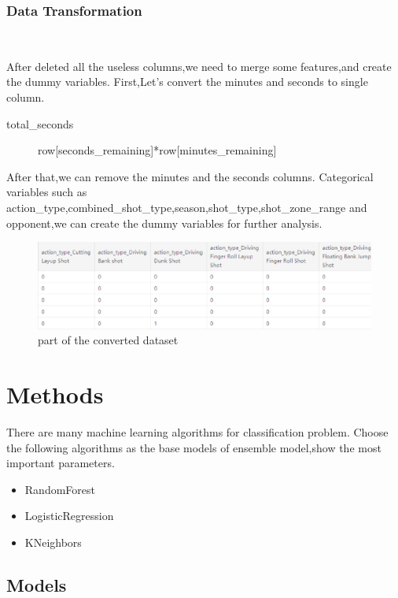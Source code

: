 \subsubsection{Data Transformation}
\

After deleted all the useless columns,we need to merge some features,and create the dummy variables.
First,Let's convert the minutes and seconds to single column.
\begin{description}
	\item[total\_seconds] row[seconds\_remaining]*row[minutes\_remaining] 
\end{description}
After that,we can remove the minutes and the seconds columns.
Categorical variables such as action_type,combined_shot_type,season,shot_type,shot_zone_range 
and opponent,we can create the dummy variables for further analysis.
\begin{figure}[htbp]
	\centering
	\includegraphics[scale=0.3]{u.eps
	}        %
	\caption{part of the converted dataset}
	\label{fig8}
\end{figure}

\section{Methods}

There are many machine learning algorithms 
for classification problem. 
Choose the following algorithms
as the base models of ensemble model,show the most important parameters.

\begin{itemize}
	\item RandomForest 
	\item LogisticRegression

	\item KNeighbors 

\end{itemize}
\subsection{Models}
\

